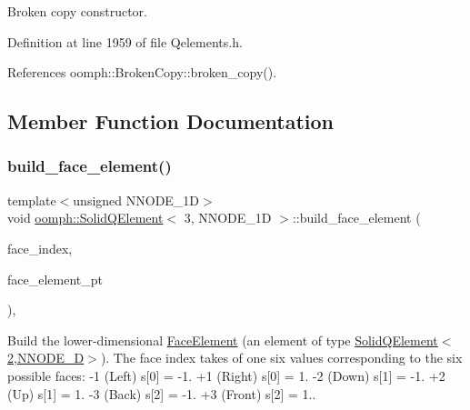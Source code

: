 Broken copy constructor. 



Definition at line 1959 of file Qelements.\+h.



References oomph\+::\+Broken\+Copy\+::broken\+\_\+copy().



\subsection{Member Function Documentation}
\mbox{\label{classoomph_1_1SolidQElement_3_013_00_01NNODE__1D_01_4_afef062d54dc1803292d8a9a4634afe1c}} 
\subsubsection{\texorpdfstring{build\+\_\+face\+\_\+element()}{build\_face\_element()}}
{\footnotesize\ttfamily template$<$unsigned N\+N\+O\+D\+E\+\_\+1D$>$ \\
void \hyperlink{classoomph_1_1SolidQElement}{oomph\+::\+Solid\+Q\+Element}$<$ 3, N\+N\+O\+D\+E\+\_\+1D $>$\+::build\+\_\+face\+\_\+element (\begin{DoxyParamCaption}\item[{const int \&}]{face\+\_\+index,  }\item[{\hyperlink{classoomph_1_1FaceElement}{Face\+Element} $\ast$}]{face\+\_\+element\+\_\+pt }\end{DoxyParamCaption})\hspace{0.3cm}{\ttfamily [inline]}, {\ttfamily [virtual]}}



Build the lower-\/dimensional \hyperlink{classoomph_1_1FaceElement}{Face\+Element} (an element of type \hyperlink{classoomph_1_1SolidQElement_3_012_00_01NNODE__1D_01_4}{Solid\+Q\+Element$<$2,\+N\+N\+O\+D\+E\+\_\+D$>$}). The face index takes of one six values corresponding to the six possible faces\+: -\/1 (Left) s\mbox{[}0\mbox{]} = -\/1. +1 (Right) s\mbox{[}0\mbox{]} = 1. -\/2 (Down) s\mbox{[}1\mbox{]} = -\/1. +2 (Up) s\mbox{[}1\mbox{]} = 1. -\/3 (Back) s\mbox{[}2\mbox{]} = -\/1. +3 (Front) s\mbox{[}2\mbox{]} = 1.. 

